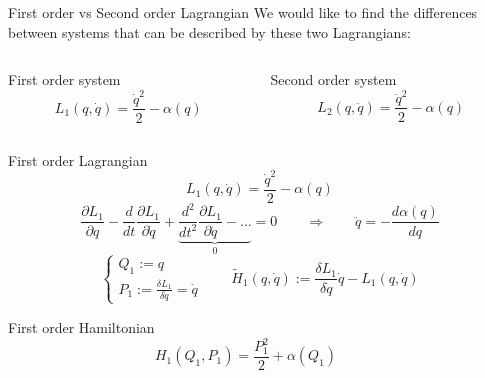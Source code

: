 \begin{frame}{First order vs Second order Lagrangian}
  We would like to find the differences between systems that can be
  described by these two Lagrangians:
  \vspace{0.5em}
  \begin{columns}
    \begin{column}{0.4\textwidth}
      \begin{center}
        \alert{First order system}
        \begin{equation*}
          L_1(q, \dot{q}) = \frac{\dot{q}^2}{2} - \alpha(q)
        \end{equation*}
      \end{center}
    \end{column}
    \begin{column}{0.4\textwidth}
      \begin{center}
        \alert{Second order system}
        \begin{equation*}
          L_2(q, \ddot{q}) = \frac{\ddot{q}^2}{2} - \alpha(q)
        \end{equation*}
      \end{center}
    \end{column}
  \end{columns}
\end{frame}

\begin{frame}{First order Lagrangian}
  \begin{equation*}
    L_1(q, \dot{q}) = \frac{\dot{q}^2}{2} - \alpha(q)
  \end{equation*}
  \vspace{0.2em}
  \begin{equation*} \label{eq: first-order_motion_eq_lagr}
    \frac{\partial L_1}{\partial q} -
    \frac{d}{dt}\frac{\partial L_1}{\partial \dot{q}} +
    \underbrace{
    \frac{d^2}{dt^2}\frac{\partial L_1}{\partial \ddot{q}} - \ldots }_0 = 0
    \qquad \Rightarrow \qquad
    \ddot{q} = - \frac{d\alpha(q)}{dq}
  \end{equation*}
  \begin{equation*}
    \begin{cases}
      Q_1 := q \\
      P_1 := \frac{\delta L_1}{\delta \dot{q}} = \dot{q}
    \end{cases}
    \qquad
    \tilde{H}_1(q, \dot{q}) :=
    \frac{\delta L_1}{\delta \dot{q}} \dot{q} - L_1(q, \dot{q})
  \end{equation*}
  \begin{block}{First order Hamiltonian}
    \begin{equation*} \label{eq: first-order_motion_eq_ham}
      H_1(Q_1, P_1) = \frac{P_1^2}{2} + \alpha(Q_1) \qquad
    \end{equation*}
  \end{block}
\end{frame}

